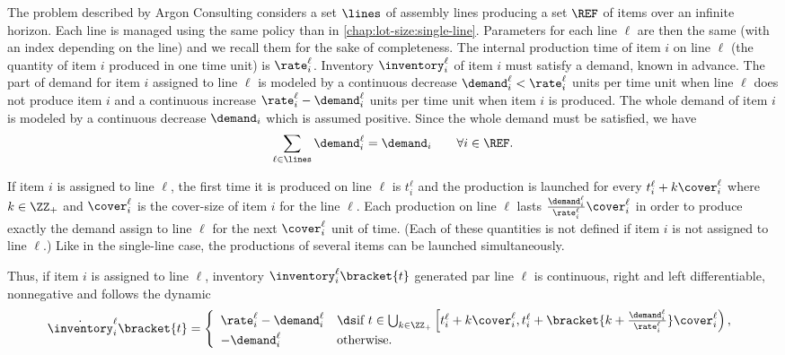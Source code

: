 The problem described by Argon Consulting considers a set $\lines$ of assembly lines producing a set $\REF$ of items over an infinite horizon.
Each line is managed using the same policy than in \cref{chap:lot-size:single-line}.
Parameters for each line $\ell$ are then the same (with an index depending on the line) and we recall them for the sake of completeness.
The internal production time of item $i$ on line $\ell$ (\ie the quantity of item $i$ produced in one time unit) is $\rate_i^{\ell}$.
Inventory $\inventory_i^\ell$ of item $i$ must satisfy a demand, known in advance.
The part of demand for item $i$ assigned to line $\ell$ is modeled by a continuous decrease $\demand_i^{\ell}<\rate_i^{\ell}$ units per time unit when line $\ell$ does not produce item $i$ and a continuous increase $\rate_i^{\ell}-\demand_i^{\ell}$ units per time unit when item $i$ is produced.
The whole demand of item $i$ is modeled by a continuous decrease $\demand_i$ which is assumed positive.
Since the whole demand must be satisfied, we have
\begin{equation}\label{eq:lot-size:multi-line:motivations:whole-demand}
  \sum_{\ell\in\lines}\demand_i^{\ell}=\demand_i\qquad\forall i\in\REF.
\end{equation}


If item $i$ is assigned to line $\ell$, the first time it is produced on line $\ell$ is $t_i^{\ell}$ and the production is launched for every $t_i^{\ell}+k\cover_i^{\ell}$ where $k\in\ZZ_+$ and $\cover_i^{\ell}$ is the cover-size of item $i$ for the line $\ell$.
Each production on line $\ell$ lasts $\frac{\demand_i^{\ell}}{\rate_i^{\ell}}\cover_i^{\ell}$ in order to produce exactly the demand assign to line $\ell$ for the next $\cover_i^{\ell}$ unit of time.
(Each of these quantities is not defined if item $i$ is not assigned to line $\ell$.)
Like in the single-line case, the productions of several items can be launched simultaneously.


Thus, if item $i$ is assigned to line $\ell$, inventory $\inventory_i^{\ell}\bracket{t}$ generated par line $\ell$ is continuous, right and left differentiable, nonnegative and follows the dynamic
\begin{equation}\label{eq:lot-size:multi-line:motivations:dynamic}
  \dot{\inventory}_i^{\ell}\bracket{t} =
  \left\{
  \begin{array}{ll}
  \rate_i^{\ell}-\demand_i^{\ell}
  & \ds\mbox{if}\ t\in\bigcup_{k\in\ZZ_+} \left[t_i^{\ell}+k\cover_i^{\ell},t_i^{\ell}+\bracket{k+\frac{\demand_i^{\ell}}{\rate_i^{\ell}}}\cover_i^{\ell}\right),
  \\
  -\demand_i^{\ell}
  & \mbox{otherwise}.
  \end{array}
  \right.
\end{equation}


